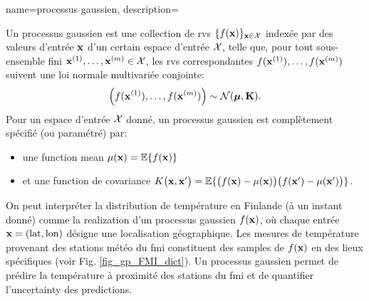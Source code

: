 {name={processus gaussien},
	description={Un  processus gaussien est une collection de \glspl{rv} 
		$\{f({\bf x})\}_{{\bf x} \in \mathcal{X}}$ indexée par des valeurs d’entrée ${\bf x}$ 
		d’un certain espace d’entrée $\mathcal{X}$, telle que, pour tout sous-ensemble fini 
		${\bf x}^{(1)}, \ldots, {\bf x}^{(m)} \in \mathcal{X}$, 
		les \glspl{rv} correspondantes $f({\bf x}^{(1)}), \ldots, f({\bf x}^{(m)})$ suivent une loi normale multivariée conjointe:
		\[
		\left( f({\bf x}^{(1)}), \ldots, f({\bf x}^{(m)}) \right) \sim \mathcal{N}(\boldsymbol{\mu}, \mathbf{K}).
		\]
		Pour un espace d’entrée $\mathcal{X}$ donné, un processus gaussien est complètement spécifié (ou paramétré) par:
		\begin{itemize}
			\item une \gls{function} \gls{mean} $\mu({\bf x}) = \mathbb{E}\{ f({\bf x})\}$
			\item et une \gls{function} de \gls{covariance} $K\big({\bf x},{\bf x}'\big) = \mathbb{E}\{ \big(f({\bf x})-\mu({\bf x})\big) \big(f({\bf x}')-\mu({\bf x}')\big) \}$.
		\end{itemize}
		 On peut interpréter la distribution de température en Finlande (à un instant donné) 
		comme la \gls{realization} d’un processus gaussien $f({\bf x})$, où chaque entrée ${\bf x} = (\text{lat}, \text{lon})$ 
		désigne une localisation géographique. Les mesures de température provenant des stations météo du \gls{fmi} 
		constituent des \glspl{sample} de $f({\bf x})$ en des lieux spécifiques (voir Fig. \ref{fig_gp_FMI_dict}). 
		Un processus gaussien permet de prédire la température à proximité des stations du \gls{fmi} et de quantifier l’\gls{uncertainty} 
		des \glspl{prediction}. 
		\begin{figure}[H]
			\begin{center}
\end{center}
\end{figure}}}
